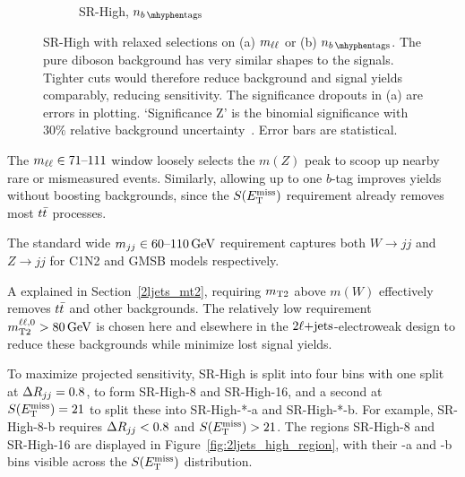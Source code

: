\begin{figure}[tp]
\begin{subfigure}{0.48\textwidth}
\caption{SR-High, $\nbtag$}
\end{subfigure}
\caption[
SR-High with relaxed selections on (a) $\mll$ or (b) $\nbtag$
]{%
SR-High with relaxed selections on (a) $\mll$ or (b) $\nbtag$.
The pure diboson background has very similar shapes to the signals.
Tighter cuts would therefore reduce background and signal yields comparably,
reducing sensitivity.
The significance dropouts in (a) are errors in plotting.
`Significance Z' is the binomial significance with $30\%$ relative background
uncertainty~\cite{cousins2008evaluation}.
Error bars are statistical.
}
\label{fig:2ljets_high_mll_b}
\end{figure}

The $\mll \in 71\textrm{--}111$ window loosely selects the $m(Z)$ peak to
scoop up nearby rare or mismeasured events.
Similarly, allowing up to one $b$-tag improves yields without boosting
backgrounds, since the $\metsig$ requirement already removes most $\ttbar$
processes.

The standard wide $\mjj \in 60\textrm{--}110\,\eV[G]$ requirement captures
both $W\rightarrow jj$ and $Z\rightarrow jj$ for C1N2 and GMSB models
respectively.

A explained in Section~\ref{2ljets_mt2}, requiring $\mttwo$ above $m(W)$
effectively removes $\ttbar$ and other backgrounds.
The relatively low requirement $\mttwoll > 80\,\eV[G]$ is chosen here and
elsewhere in the $\twoljets$-electroweak design to reduce these backgrounds
while minimize lost signal yields.

To maximize projected sensitivity, SR-High is split into four bins with
one split at $\rjj = 0.8$, to form SR-High-8 and SR-High-16, and a second at
$\metsig = 21$ to split these into SR-High-*-a and SR-High-*-b.
For example, SR-High-8-b requires $\rjj < 0.8$ and $\metsig > 21$.
The regions SR-High-8 and SR-High-16 are displayed in
Figure~\ref{fig:2ljets_high_region}, with their -a and -b bins visible across
the $\metsig$ distribution.

